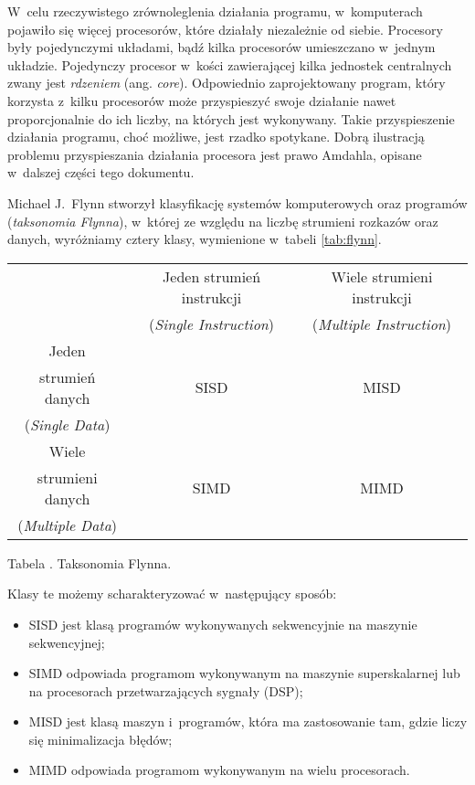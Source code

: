 \documentclass[12pt]{mwart}
\newcounter{tabmain}
\newcommand{\mytabcaption}[1]{ \begin{center}Tabela \arabic{tabmain}. #1.\end{center} \addtocounter{tabmain}{1} }
\begin{document}
%
\indent
	W~celu rzeczywistego zrównoleglenia działania programu, w~komputerach pojawiło się więcej procesorów,
	które działały niezależnie od siebie. Procesory były pojedynczymi układami, bądź kilka procesorów umieszczano w~jednym układzie. 
	Pojedynczy procesor w~kości zawierającej kilka jednostek centralnych zwany jest \emph{rdzeniem} (ang. \emph{core}).
	Odpowiednio zaprojektowany program,	który korzysta z~kilku procesorów może przyspieszyć swoje działanie nawet proporcjonalnie do ich liczby,
	na których jest wykonywany.	Takie przyspieszenie działania programu, choć możliwe, jest rzadko spotykane.
	Dobrą ilustracją problemu przyspieszania działania procesora jest prawo Amdahla, opisane w~dalszej części tego dokumentu.
\par
%
\indent
	Michael J.~Flynn stworzył klasyfikację systemów komputerowych oraz programów (\emph{taksonomia Flynna}), w~której ze względu na liczbę
	strumieni rozkazów oraz danych, wyróżniamy cztery klasy, wymienione w~tabeli \ref{tab:flynn}.
	\begin{center}
	\centering
	\begin{tabular}{|c|c|c|} \hline
													 & Jeden strumień instrukcji	 & Wiele strumieni instrukcji \\
													 & (\emph{Single Instruction}) & (\emph{Multiple Instruction}) \\\hline
			Jeden                &     												 &      \\
			strumień danych      &  SISD										   & MISD 			\\
			(\emph{Single Data}) &                             & \\\hline
			Wiele                &     												 &      \\
			strumieni danych     & SIMD                        & MIMD \\
			(\emph{Multiple Data}) & 										 & 			\\\hline
	\end{tabular}
	\mytabcaption{Taksonomia Flynna}
	\label{tab:flynn}
	\end{center}
	Klasy te możemy scharakteryzować w~następujący sposób:
	\begin{itemize}
		\item SISD jest klasą programów wykonywanych sekwencyjnie na maszynie sekwencyjnej;
		\item SIMD odpowiada programom wykonywanym na maszynie superskalarnej lub na procesorach przetwarzających sygnały (DSP);
		\item MISD jest klasą maszyn i~programów, która ma zastosowanie tam, gdzie liczy się minimalizacja błędów;
		\item MIMD odpowiada programom wykonywanym na wielu procesorach.
	\end{itemize}
\end{document}
